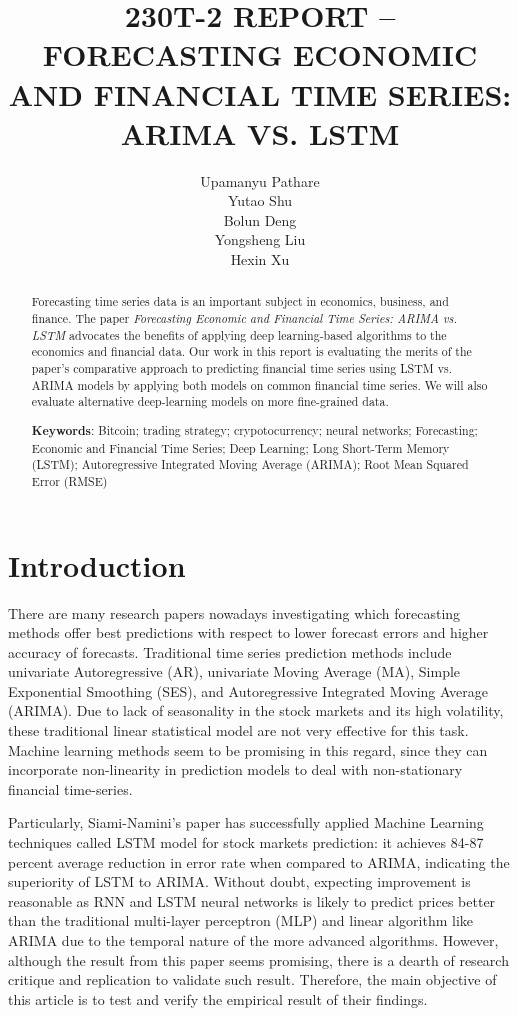 \documentclass{article}
\title{230T-2 REPORT -- FORECASTING ECONOMIC AND FINANCIAL TIME SERIES: ARIMA VS. LSTM}
\author{
 Upamanyu Pathare \\
   \And
 Yutao Shu \\
  
  \And
 Bolun Deng \\
 
  \And
 Yongsheng Liu \\
 
  \And
 Hexin Xu \\
  
}
\begin{document}
\maketitle
\begin{abstract}
 Forecasting time series data is an important subject in economics, business, and finance. 
 The paper
 \textit{Forecasting Economic and Financial Time Series: ARIMA vs. LSTM}
 advocates the benefits of applying deep learning-based algorithms to the economics and financial data. Our work in this report is evaluating the merits of the paper’s comparative approach to predicting financial time series using LSTM vs. ARIMA models by applying both models on common financial time series. We will also evaluate alternative deep-learning models on more fine-grained data.
 
 \vspace{5mm} %
 
 \textbf{Keywords}: Bitcoin; trading strategy; crypotocurrency; neural networks; Forecasting; Economic and Financial Time Series; Deep Learning; Long Short-Term Memory (LSTM); Autoregressive Integrated Moving Average (ARIMA); Root Mean Squared Error (RMSE)



\end{abstract}



\section{Introduction}
There are many research papers nowadays investigating which forecasting methods offer best predictions with respect to lower forecast errors and higher accuracy of forecasts. Traditional time series prediction methods include univariate Autoregressive (AR), univariate Moving Average (MA), Simple Exponential Smoothing (SES), and Autoregressive Integrated Moving Average (ARIMA). Due to lack of seasonality in the stock markets and its high volatility, these traditional linear statistical model are not very effective for this task. Machine learning methods seem to be promising in this regard, since they can incorporate non-linearity in prediction models to deal with non-stationary financial time-series. 

Particularly, Siami-Namini's paper has successfully applied Machine Learning techniques called  LSTM model for stock markets prediction: it achieves 84-87 percent average reduction in error rate when compared to ARIMA, indicating the superiority of LSTM to ARIMA. Without doubt, expecting improvement is reasonable as RNN and LSTM neural networks is likely to predict prices better than the traditional multi-layer perceptron (MLP) and linear algorithm like ARIMA due to the temporal nature of the more advanced algorithms. However, although the result from this paper seems promising, there is a dearth of research critique and replication to validate such result. Therefore, the main objective of this article is to test and verify the empirical result of their findings.
\end{document}
